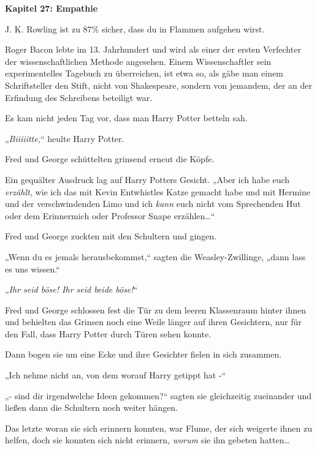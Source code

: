 

\hypertarget{empathie}{%

\textbf{Kapitel 27: Empathie}

J. K. Rowling ist zu 87\% sicher, dass du in Flammen aufgehen wirst.

Roger Bacon lebte im 13. Jahrhundert und wird als einer der ersten Verfechter der wissenschaftlichen Methode angesehen. Einem Wissenschaftler sein experimentelles Tagebuch zu überreichen, ist etwa so, als gäbe man einem Schriftsteller den Stift, nicht von Shakespeare, sondern von jemandem, der an der Erfindung des Schreibens beteiligt war.

\later

Es kam nicht jeden Tag vor, dass man Harry Potter betteln sah.

„\emph{Biiiiitte,}“ heulte Harry Potter.

Fred und George schüttelten grinsend erneut die Köpfe.

Ein gequälter Ausdruck lag auf Harry Potters Gesicht. „Aber ich habe euch \emph{erzählt,} wie ich das mit Kevin Entwhistles Katze gemacht habe und mit Hermine und der verschwindenden Limo und ich \emph{kann} euch nicht vom Sprechenden Hut oder dem Erinnermich oder Professor Snape erzählen…“

Fred und George zuckten mit den Schultern und gingen.

„Wenn du es jemals herausbekommst,“ sagten die Weasley-Zwillinge, „dann lass es uns wissen.“

„\emph{Ihr seid böse! Ihr seid beide böse!}“

Fred und George schlossen fest die Tür zu dem leeren Klassenraum hinter ihnen und behielten das Grinsen noch eine Weile länger auf ihren Gesichtern, nur für den Fall, dass Harry Potter durch Türen sehen konnte.

Dann bogen sie um eine Ecke und ihre Gesichter fielen in sich zusammen.

„Ich nehme nicht an, von dem worauf Harry getippt hat -“

„- sind dir irgendwelche Ideen gekommen?“ sagten sie gleichzeitig zueinander und ließen dann die Schultern noch weiter hängen.

Das letzte woran sie sich erinnern konnten, war Flume, der sich weigerte ihnen zu helfen, doch sie konnten sich nicht erinnern, \emph{worum} sie ihn gebeten hatten…

}
